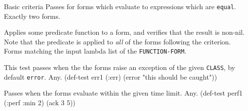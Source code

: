 \begin{criteriaGroup}{Basic criteria}{}
{Passes for forms which evaluate to expressions which are
\texttt{equal}.}
{Exactly two forms.}
{\noExpl}
{\noEx}{}

{Applies some predicate function to a form, and verifies that the
result is non-nil.  Note that the predicate is applied to \emph{all}
of the forms following the criterion.}
{Forms matching the input lambda list of the \texttt{FUNCTION-FORM}.}
{\noExpl}
{\multiEx}
{
 }

{This test passes when the the forms raise an exception of the given
\texttt{CLASS}, by default \texttt{error}.}
{Any.}
{\noExpl}
{\singleEx}{(def-test err1 (:err) (error "this should be caught"))}

{Passes when the forms evaluate within the given time limit.}
{Any.}
{\noExpl}
{\singleEx}{(def-test perf1 (:perf :min 2) (ack 3 5))}

\end{criteriaGroup}

